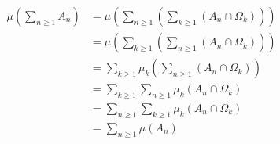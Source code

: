 \documentclass{ctexart}
\begin{document}
\begin{solution}
\begin{itemize}
      \[
        \begin{aligned}
          \mu(\sum_{n \geq 1} A_n) &= \mu(\sum_{n \geq 1} (\sum_{k \geq 1} (A_n \cap \Omega_k)))\\ 
          &= \mu(\sum_{k \geq 1} (\sum_{n \geq 1} (A_n \cap \Omega_k)))\\ 
          &= \sum_{k \geq 1}\mu_k(\sum_{n \geq 1}(A_n \cap \Omega_k))\\ 
          &= \sum_{k \geq 1}\sum_{n \geq 1} \mu_k(A_n \cap \Omega_k)\\ 
          &=\sum_{n \geq 1}\sum_{k \geq 1}\mu_k(A_n \cap \Omega_k)\\ 
          &=\sum_{n \geq 1}\mu(A_n)
        \end{aligned}
      \]
  \end{itemize}
\end{solution}
\end{document}
